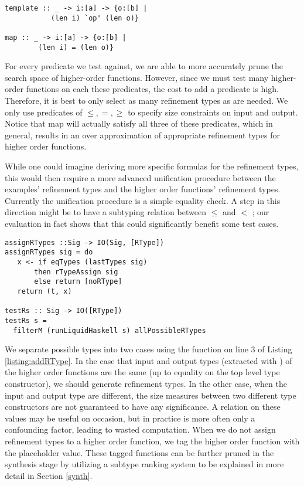 \begin{lstlisting}[numbers=none]
template :: _ -> i:[a] -> {o:[b] |
           (len i) `op' (len o)}
        
map :: _ -> i:[a] -> {o:[b] |
        (len i) = (len o)}
\end{lstlisting}


For every predicate  we test against, we are able to more accurately prune the search space of higher-order functions.
However, since we must test many higher-order functions on each these predicates, the cost to add a predicate is high.
Therefore, it is best to only select as many refinement types as are needed.
We only use predicates of $\leq,=,\geq$ to specify size constraints on input and output.
Notice that map will actually satisfy all three of these predicates, which in general, results in an over approximation of appropriate refinement types for higher order functions.

While one could imagine deriving more specific formulas for the refinement types, this would then require a more advanced unification procedure between the examples' refinement types and the higher order functions' refinement types.
Currently the unification procedure is a simple equality check.
A step in this direction might be to have a subtyping relation between $\leq$ and $<$ ; our evaluation in fact shows that this could significantly benefit some test cases.


\begin{lstlisting}[caption=Adding refinement types to higher order functions,label=listing:addRType]
assignRTypes ::Sig -> IO(Sig, [RType])
assignRTypes sig = do
   x <- if eqTypes (lastTypes sig) 
       then rTypeAssign sig
       else return [noRType]
   return (t, x)

testRs :: Sig -> IO([RType])
testRs s =
  filterM (runLiquidHaskell s) allPossibleRTypes
\end{lstlisting}

We separate possible types into two cases using the  function on line 3 of Listing \ref{listing:addRType}.
In the case that input and output types (extracted with ) of the higher order functions are the same (up to equality on the top level type constructor), we should generate refinement types.
In the other case, when the input and output type are different, the size measures between two different type constructors are not guaranteed to have any significance.
A relation on these values may be useful on occasion, but in practice is more often only a confounding factor, leading to wasted computation.
When we do not assign refinement types to a higher order function, we tag the higher order function with the placeholder  value.
These  tagged functions can be further pruned in the synthesis stage by utilizing a subtype ranking system to be explained in more detail in Section \ref{synth}.

